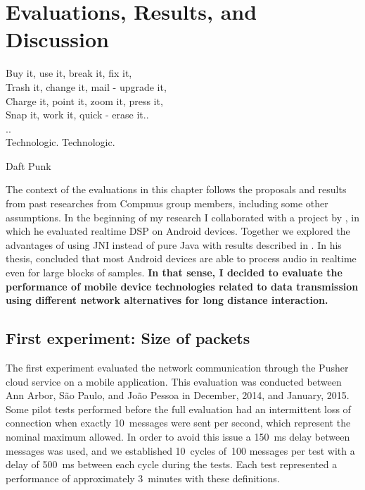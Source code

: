 \chapter{Evaluations, Results, and Discussion}
\label{cap:evaluations}
 
 \epigraph{
 	Buy it, use it, break it, fix it,\\
 	Trash it, change it, mail - upgrade it,\\
 	Charge it, point it, zoom it, press it,\\
 	Snap it, work it, quick - erase it..\\
 	..\\
 	Technologic. Technologic.}
 {Daft Punk}

The context of the evaluations in this chapter follows the proposals and results from past researches from Compmus group members, including some other assumptions.
In the beginning of my research I collaborated with a project by , in which he evaluated realtime DSP on Android devices.
Together we explored the advantages of using JNI instead of pure Java with results described in \citep{deCarvalhoJunior2013fftbenchmark}.
In his thesis,  concluded that most Android devices are able to process audio in realtime even for large blocks of samples.
\textbf{In that sense, I decided to evaluate the performance of mobile device technologies related to data transmission using different network alternatives for long distance interaction.}

\section{First experiment: Size of packets}
\label{sec:firsttrial}

The first experiment evaluated the network communication through the Pusher cloud service on a mobile application.
This evaluation was conducted between Ann Arbor, São Paulo, and João Pessoa in December, 2014, and January, 2015.
Some pilot tests performed before the full evaluation had an intermittent loss of connection when exactly 10~messages were sent per second, which represent the nominal maximum allowed.
In order to avoid this issue a 150~ms delay between messages was used, and we established 10~cycles of~100 messages per test with a delay of 500~ms between each cycle during the tests.
Each test represented a performance of approximately 3~minutes with these definitions.

